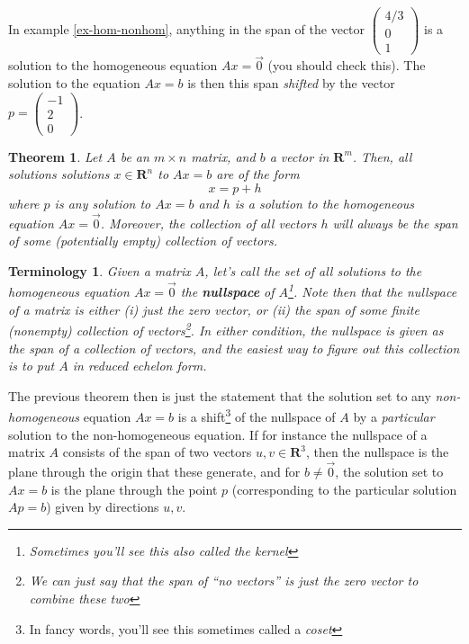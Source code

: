 \documentclass[12pt]{article}
\numberwithin{equation}{subsection}
\numberwithin{figure}{subsection}
\newtheorem{thm}[subsection]{Theorem}
\theoremstyle{note}
\newtheorem{terminology}[subsection]{Terminology}
\begin{document}
In example \ref{ex-hom-nonhom}, anything in the span of the vector $\begin{pmatrix} 4/3 \\ 0 \\ 1\end{pmatrix}$ is a solution to the homogeneous equation $Ax=\vec{0}$ (you should check this). The solution to the equation $Ax=b$ is then this span \textit{shifted} by the vector $p=\begin{pmatrix} -1 \\ 2 \\ 0 \end{pmatrix}$.

\begin{thm}
	Let $A$ be an $m\times n$ matrix, and $b$ a vector in $\mathbf{R}^m$. Then, all solutions solutions $x\in \mathbf{R}^n$ to $Ax=b$ are of the form \begin{equation} x=p+h\end{equation} where $p$ is \textit{any} solution to $Ax=b$ and $h$ is a solution to the homogeneous equation $Ax=\vec{0}$. Moreover, the collection of all vectors $h$ will always be the span of some (potentially empty) collection of vectors.
\end{thm}

\begin{terminology} Given a matrix $A$, let's call the set of all solutions to the homogeneous equation $Ax=\vec{0}$ the \textbf{nullspace} of $A$\footnote{Sometimes you'll see this also called the \textit{kernel}}. Note then that the nullspace of a matrix is either (i) just the zero vector, or (ii) the span of some finite (nonempty) collection of vectors\footnote{We can just say that the span of ``no vectors'' is just the zero vector to combine these two}. In either condition, the nullspace is given as the span of a collection of vectors, and the easiest way to figure out this collection is to put $A$ in reduced echelon form. 
\end{terminology}

The previous theorem then is just the statement that the solution set to any \textit{non-homogeneous} equation $Ax=b$ is a shift\footnote{In fancy words, you'll see this sometimes called a \textit{coset}} of the nullspace of $A$ by a \textit{particular} solution to the non-homogeneous equation. If for instance the nullspace of a matrix $A$ consists of the span of two vectors $u,v\in \mathbf{R}^3$, then the nullspace is the plane through the origin that these generate, and for $b\neq \vec{0}$, the solution set to $Ax=b$ is the plane through the point $p$ (corresponding to the particular solution $Ap=b$) given by directions $u,v$. 
\end{document}

